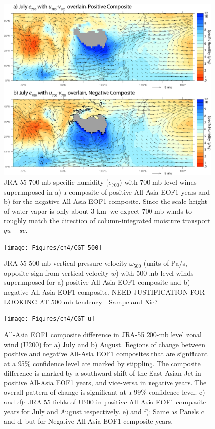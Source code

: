 \begin{figure}
\centering
\noindent\includegraphics[width=36pc]{Figures/ch4/CGT_700}
\caption{JRA-55 700-mb specific humidity ($e_{700}$) with 700-mb level winds superimposed in a) a composite of positive All-Asia EOF1 years and b) for the negative All-Asia EOF1 composite. Since the scale height of water vapor is only about 3 km, we expect 700-mb winds to roughly match the direction of column-integrated moisture transport $qu-qv$.}\label{fig:cgt_700}
\end{figure}

\begin{figure}
\centering
\noindent\texttt{[image: Figures/ch4/CGT\_500]}
\caption{JRA-55 500-mb vertical pressure velocity $\omega_{500}$ (units of Pa/s, opposite sign from vertical velocity $w$) with 500-mb level winds superimposed for a) positive All-Asia EOF1 composite and b) negative All-Asia EOF1 composite. NEED JUSTIFICATION FOR LOOKING AT 500-mb tendency - Sampe and Xie?}
\label{fig:cgt_500}
\end{figure}

\begin{figure}
\centering
\noindent\texttt{[image: Figures/ch4/CGT\_u]}
\caption{All-Asia EOF1 composite difference in JRA-55 200-mb level zonal wind (U200) for a) July and b) August. Regions of change between positive and negative All-Asia EOF1 composites that are significant at a 95\% confidence level are marked by stippling. The composite difference is marked by a southward shift of the East Asian Jet in positive All-Asia EOF1 years, and vice-versa in negative years. The overall pattern of change is significant at a 99\% confidence level. c) and d): JRA-55 fields of U200 in positive All-Asia EOF1 composite years for July and August respectively. e) and f): Same as Panels c and d, but for Negative All-Asia EOF1 composite years.}
\label{fig:cgt_u}
\end{figure}

